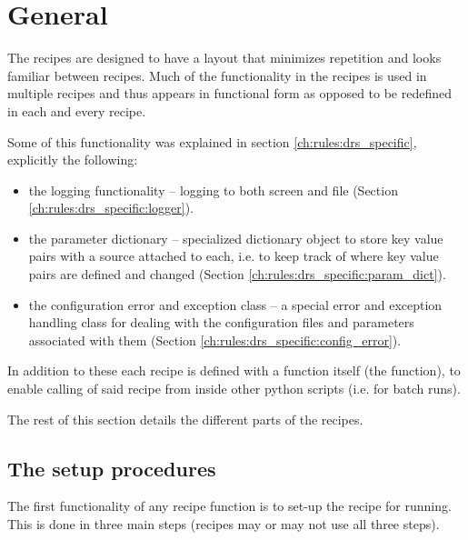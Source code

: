 \ifdevguide
\section{General}
\label{ch:the_recipes:gen_layout}

The recipes are designed to have a layout that minimizes repetition and looks familiar between recipes. Much of the functionality in the recipes is used in multiple recipes and thus appears in functional form as opposed to be redefined in each and every recipe.

Some of this functionality was explained in section \ref{ch:rules:drs_specific}, explicitly the following:
\begin{itemize}
	\item the logging functionality -- logging to both screen and file (Section \ref{ch:rules:drs_specific:logger}).
	\item the parameter dictionary -- specialized dictionary object to store key value pairs with a source attached to each, i.e. to keep track of where key value pairs are defined and changed (Section \ref{ch:rules:drs_specific:param_dict}).
	\item the configuration error and exception class -- a special error and exception handling class for dealing with the configuration files and parameters associated with them (Section \ref{ch:rules:drs_specific:config_error}).
\end{itemize}

\vspace{0.5cm}
\noindent In addition to these each recipe is defined with a function itself (the \progMAIN function), to enable calling of said recipe from inside other python scripts (i.e. for batch runs).

\vspace{0.5cm}
\noindent The rest of this section details the different parts of the recipes.

\subsection{The setup procedures}
\label{ch:the_recipes:gen_layout:setup}


The first functionality of any recipe \progMAIN function is to set-up the recipe for running. This is done in three main steps (recipes may or may not use all three steps).

